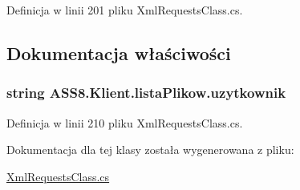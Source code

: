 Definicja w linii 201 pliku XmlRequestsClass.cs.

\subsection{Dokumentacja właściwości}
\hypertarget{a00015_87d283970184c0a6185983930bd4c6f0}{
\subsubsection[{uzytkownik}]{\setlength{\rightskip}{0pt plus 5cm}string ASS8.Klient.listaPlikow.uzytkownik}}
\label{dd/d1b/a00015_87d283970184c0a6185983930bd4c6f0}




Definicja w linii 210 pliku XmlRequestsClass.cs.

Dokumentacja dla tej klasy została wygenerowana z pliku:\begin{CompactItemize}
\item 
\hyperlink{a00055}{XmlRequestsClass.cs}\end{CompactItemize}

